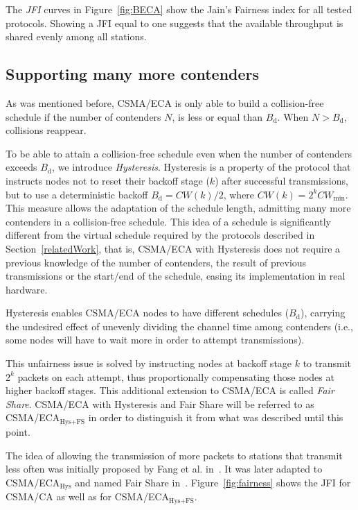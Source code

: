 The \emph{JFI } curves in Figure~\ref{fig:BECA} show the Jain's Fairness index for all tested protocols. Showing a JFI equal to one suggests that the available throughput is shared evenly among all stations.

	\subsection{Supporting many more contenders}\label{moreContenders}
	As was mentioned before, CSMA/ECA is only able to build a collision-free schedule if the number of contenders $N$, is less or equal than $B_{\text{d}}$. When $N > B_{\text{d}}$, collisions reappear. 
	
	To be able to attain a collision-free schedule even when the number of contenders exceeds $B_{\text{d}}$, we introduce \emph{Hysteresis}. Hysteresis is a property of the protocol that instructs nodes not to reset their backoff stage ($k$) after successful transmissions, but to use a deterministic backoff $B_{\text{d}}=CW(k)/2$, where $CW(k)=2^{k}CW_{\min}$. This measure allows the adaptation of the schedule length, admitting many more contenders in a collision-free schedule. This idea of a schedule is significantly different from the virtual schedule required by the protocols described in Section~\ref{relatedWork}, that is, CSMA/ECA with Hysteresis does not require a previous knowledge of the number of contenders, the result of previous transmissions or the start/end of the schedule, easing its implementation in real hardware.
	
	Hysteresis enables CSMA/ECA nodes to have different schedules ($B_{\text{d}}$), carrying the undesired effect of unevenly dividing the channel time among contenders (i.e., some nodes will have to wait more in order to attempt transmissions).
	
	This unfairness issue is solved by instructing nodes at backoff stage $k$ to transmit $2^{k}$ packets on each attempt, thus proportionally compensating those nodes at higher backoff stages. This additional extension to CSMA/ECA is called \emph{Fair Share}. CSMA/ECA with Hysteresis and Fair Share will be referred to as CSMA/ECA$_{\text{Hys+FS}}$ in order to distinguish it from what was described until this point.
	
	The idea of allowing the transmission of more packets to stations that transmit less often was initially proposed by Fang et al. in~\cite{L_MAC}. It was later adapted to CSMA/ECA$_{\text{Hys}}$ and named Fair Share in~\cite{research2standards}. Figure~\ref{fig:fairness} shows the JFI for CSMA/CA as well as for CSMA/ECA$_{\text{Hys+FS}}$.
	

